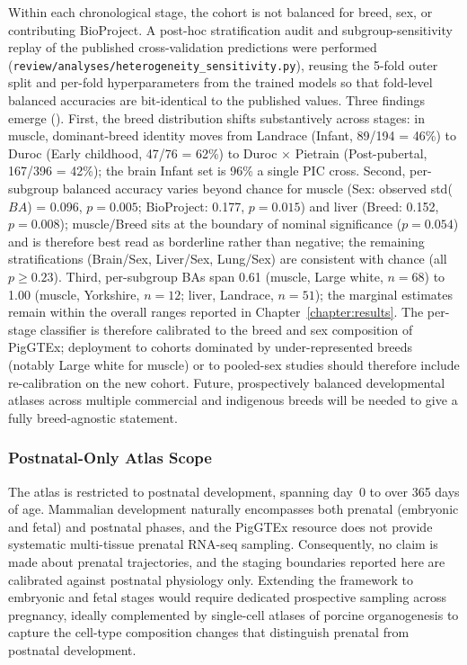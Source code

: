 Within each chronological stage, the cohort is not balanced for breed, sex, or contributing BioProject. A post-hoc stratification audit and subgroup-sensitivity replay of the published cross-validation predictions were performed (\texttt{review/analyses/heterogeneity\_sensitivity.py}), reusing the 5-fold outer split and per-fold hyperparameters from the trained models so that fold-level balanced accuracies are bit-identical to the published values. Three findings emerge (). First, the breed distribution shifts substantively across stages: in muscle, dominant-breed identity moves from Landrace (Infant, 89/194 = 46\%) to Duroc (Early childhood, 47/76 = 62\%) to Duroc $\times$ Pietrain (Post-pubertal, 167/396 = 42\%); the brain Infant set is 96\% a single PIC cross. Second, per-subgroup balanced accuracy varies beyond chance for muscle (Sex: observed std($BA$) = 0.096, $p = 0.005$; BioProject: 0.177, $p = 0.015$) and liver (Breed: 0.152, $p = 0.008$); muscle/Breed sits at the boundary of nominal significance ($p = 0.054$) and is therefore best read as borderline rather than negative; the remaining stratifications (Brain/Sex, Liver/Sex, Lung/Sex) are consistent with chance (all $p \geq 0.23$). Third, per-subgroup BAs span 0.61 (muscle, Large white, $n = 68$) to 1.00 (muscle, Yorkshire, $n = 12$; liver, Landrace, $n = 51$); the marginal estimates remain within the overall ranges reported in Chapter~\ref{chapter:results}. The per-stage classifier is therefore calibrated to the breed and sex composition of PigGTEx; deployment to cohorts dominated by under-represented breeds (notably Large white for muscle) or to pooled-sex studies should therefore include re-calibration on the new cohort. Future, prospectively balanced developmental atlases across multiple commercial and indigenous breeds will be needed to give a fully breed-agnostic statement.

\subsubsection{Postnatal-Only Atlas Scope}

The atlas is restricted to postnatal development, spanning day~0 to over 365 days of age. Mammalian development naturally encompasses both prenatal (embryonic and fetal) and postnatal phases, and the PigGTEx resource does not provide systematic multi-tissue prenatal RNA-seq sampling. Consequently, no claim is made about prenatal trajectories, and the staging boundaries reported here are calibrated against postnatal physiology only. Extending the framework to embryonic and fetal stages would require dedicated prospective sampling across pregnancy, ideally complemented by single-cell atlases of porcine organogenesis to capture the cell-type composition changes that distinguish prenatal from postnatal development.

